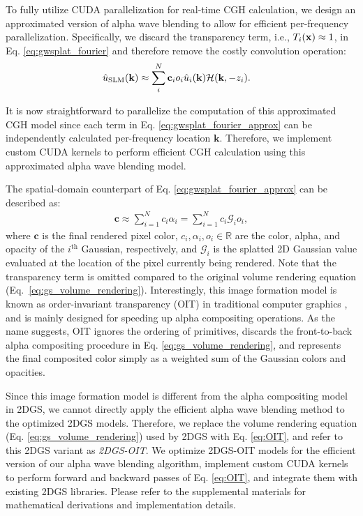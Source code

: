 To fully utilize CUDA parallelization for real-time CGH calculation, we design an approximated version of alpha wave blending to allow for efficient per-frequency parallelization. Specifically, we discard the transparency term, i.e., $T_i(\mathbf{x}) \approx 1$, in Eq. \ref{eq:gwsplat_fourier} and therefore remove the costly convolution operation: 
%
\begin{align}
    \hat{u}_{\textrm{SLM}} (\mathbf{k}) 
    & \approx \sum_{i}^N \mathbf{c}_i o_i\hat{u}_i(\mathbf{k})\mathcal{H}(\mathbf{k}, -z_i).       
    \label{eq:gwsplat_fourier_approx}
\end{align} 

It is now straightforward to parallelize the computation of this approximated CGH model since each term in Eq. \ref{eq:gwsplat_fourier_approx} can be independently calculated per-frequency location $\mathbf{k}$. Therefore, we implement custom CUDA kernels to perform efficient CGH calculation using this approximated alpha wave blending model.

The spatial-domain counterpart of Eq. \ref{eq:gwsplat_fourier_approx} can be described as:
\begin{align}
    \mathbf{c} \approx \sum_{i=1}^N c_i \alpha_i = \sum_{i=1}^N c_i \mathcal{G}_i o_i,
\label{eq:OIT}
\end{align}
where $\mathbf{c}$ is the final rendered pixel color, $c_i, \alpha_i, o_i \in \mathbb{R}$ are the color, alpha, and opacity of the $i^\text{th}$ Gaussian, respectively, and $\mathcal{G}_i$ is the splatted 2D Gaussian value evaluated at the location of the pixel currently being rendered. Note that the transparency term is omitted compared to the original volume rendering equation (Eq.~\ref{eq:gs_volume_rendering}). Interestingly, this image formation model is known as order-invariant transparency (OIT) in traditional computer graphics \cite{mcguire2013weighted}, and is mainly designed for speeding up alpha compositing operations. As the name suggests, OIT ignores the ordering of primitives, discards the front-to-back alpha compositing procedure in Eq. \ref{eq:gs_volume_rendering}, and represents the final composited color simply as a weighted sum of the Gaussian colors and opacities. 

Since this image formation model is different from the alpha compositing model in 2DGS, we cannot directly apply the efficient alpha wave blending method to the optimized 2DGS models. Therefore, we replace the volume rendering equation (Eq. \ref{eq:gs_volume_rendering}) used by 2DGS with Eq. \ref{eq:OIT}, and refer to this 2DGS variant as \textit{2DGS-OIT}. We optimize 2DGS-OIT models for the efficient version of our alpha wave blending algorithm, implement custom CUDA kernels to perform forward and backward passes of Eq. \ref{eq:OIT}, and integrate them with existing 2DGS libraries. Please refer to the supplemental materials for mathematical derivations and implementation details.


